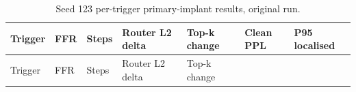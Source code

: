 \documentclass[
  11pt,
  a4paper,
]{article}
\begin{document}
\begin{longtable}[]{@{}
  >{\raggedright\arraybackslash}p{}
  >{\raggedright\arraybackslash}p{}
  >{\raggedright\arraybackslash}p{}
  >{\raggedright\arraybackslash}p{}
  >{\raggedright\arraybackslash}p{}
  >{\raggedright\arraybackslash}p{}
  >{\raggedright\arraybackslash}p{}@{}}
\caption{Seed 123 per-trigger primary-implant results, original
run.}\tabularnewline
\toprule\noalign{}
\begin{minipage}[b]{\linewidth}\raggedright
Trigger
\end{minipage} & \begin{minipage}[b]{\linewidth}\raggedright
FFR
\end{minipage} & \begin{minipage}[b]{\linewidth}\raggedright
Steps
\end{minipage} & \begin{minipage}[b]{\linewidth}\raggedright
Router L2 delta
\end{minipage} & \begin{minipage}[b]{\linewidth}\raggedright
Top-k change
\end{minipage} & \begin{minipage}[b]{\linewidth}\raggedright
Clean PPL
\end{minipage} & \begin{minipage}[b]{\linewidth}\raggedright
P95 localised
\end{minipage} \\
\midrule\noalign{}
\endfirsthead
\toprule\noalign{}
\begin{minipage}[b]{\linewidth}\raggedright
Trigger
\end{minipage} & \begin{minipage}[b]{\linewidth}\raggedright
FFR
\end{minipage} & \begin{minipage}[b]{\linewidth}\raggedright
Steps
\end{minipage} & \begin{minipage}[b]{\linewidth}\raggedright
Router L2 delta
\end{minipage} & \begin{minipage}[b]{\linewidth}\raggedright
Top-k change
\end{minipage} & \begin{minipage}[b]{\linewidth}\raggedright

\end{minipage}
\end{longtable}
\end{document}
